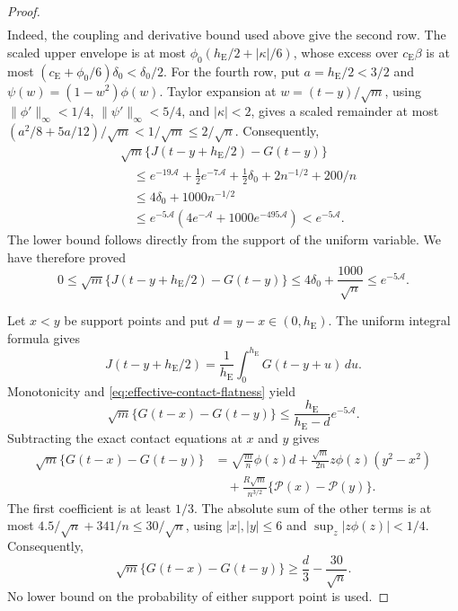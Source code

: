 \documentclass[aop]{imsart}
\theoremstyle{plain}
\theoremstyle{definition}
\theoremstyle{definition}
\newcommand{\ce}{c_{\mathrm E}}
\begin{document}
\begin{proof}
\[\begin{array}{ll}
\end{array}
\]
Indeed, the coupling and derivative bound used above give the
second row.  The scaled upper envelope is at most
$\phi_0(h_{\mathrm E}/2+|\kappa|/6)$, whose excess over
$\ce\beta$ is at most $(\ce+\phi_0/6)\delta_0<\delta_0/2$.
For the fourth row, put $a=h_{\mathrm E}/2<3/2$ and
$\psi(w)=(1-w^2)\phi(w)$.
Taylor expansion at $w=(t-y)/\sqrt m$, using
$\|\phi'\|_\infty<1/4$,
$\|\psi'\|_\infty<5/4$, and $|\kappa|<2$, gives a scaled
remainder at most
$(a^2/8+5a/12)/\sqrt m<1/\sqrt m\le2/\sqrt n$.
Consequently,
\[
 \begin{split}
 &\sqrt m\{J(t-y+h_{\mathrm E}/2)-G(t-y)\}\\
 &\quad\le e^{-19\mathcal A}
       +\tfrac12e^{-7\mathcal A}+\tfrac12\delta_0
       +2n^{-1/2}+200/n\\
 &\quad\le4\delta_0+1000n^{-1/2}\\
 &\quad\le e^{-5\mathcal A}
       \left(4e^{-\mathcal A}+1000e^{-495\mathcal A}\right)
       <e^{-5\mathcal A}.
 \end{split}
\]
The lower bound follows directly from the support of the uniform
variable.  We have therefore proved
\begin{equation}\label{eq:effective-contact-flatness}
 0\le\sqrt m\{J(t-y+h_{\mathrm E}/2)-G(t-y)\}
 \le4\delta_0+\frac{1000}{\sqrt n}\le e^{-5\mathcal A}.
\end{equation}

Let $x<y$ be support points and put $d=y-x\in(0,h_{\mathrm E})$.
The uniform integral formula gives
\[
 J(t-y+h_{\mathrm E}/2)=\frac1{h_{\mathrm E}}\int_0^{h_{\mathrm E}}G(t-y+u)\,du.
\]
Monotonicity and \eqref{eq:effective-contact-flatness} yield
\begin{equation}\label{eq:effective-increment-upper}
 \sqrt m\{G(t-x)-G(t-y)\}
 \le\frac{h_{\mathrm E}}{h_{\mathrm E}-d}e^{-5\mathcal A}.
\end{equation}
Subtracting the exact contact equations at $x$ and $y$ gives
\begin{align*}
 \sqrt m\{G(t-x)-G(t-y)\}
 &=\sqrt{\frac mn}\phi(z)d
   +\frac{\sqrt m}{2n}z\phi(z)(y^2-x^2)\\
 &\quad+\frac{R\sqrt m}{n^{3/2}}
                         \{\mathcal P(x)-\mathcal P(y)\}.
\end{align*}
The first coefficient is at least $1/3$.
The absolute sum of the other terms is at most
$4.5/\sqrt n+341/n\le30/\sqrt n$, using
$|x|,|y|\le6$ and $\sup_z|z\phi(z)|<1/4$.
Consequently,
\begin{equation}\label{eq:effective-increment-lower}
 \sqrt m\{G(t-x)-G(t-y)\}\ge\frac d3-\frac{30}{\sqrt n}.
\end{equation}
No lower bound on the probability of either support point is used.


\end{proof}
\end{document}
